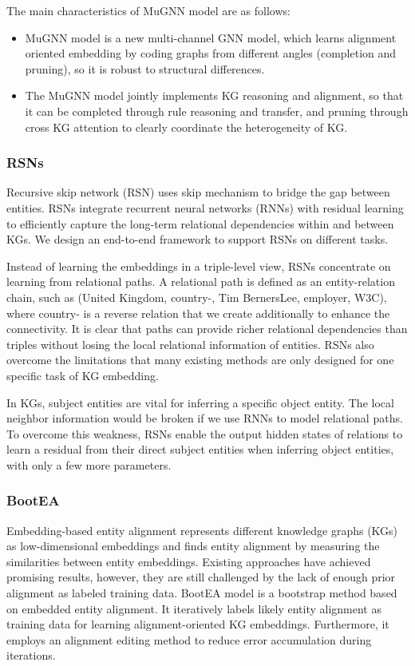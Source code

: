 \documentclass[sigconf]{acmart}
\begin{document}
{The main characteristics of MuGNN model are as follows:
\begin{itemize}
\item MuGNN model is a new multi-channel GNN model, which learns alignment oriented embedding by coding graphs from different angles (completion and pruning), so it is robust to structural differences.
\item The MuGNN model jointly implements KG reasoning and alignment, so that it can be completed through rule reasoning and transfer, and pruning through cross KG attention to clearly coordinate the heterogeneity of KG.
\end{itemize}

\subsubsection{RSNs \cite{guo2019learning}}

Recursive skip network (RSN) uses skip mechanism to bridge the gap between entities. RSNs integrate recurrent neural networks (RNNs) with residual learning to efficiently capture the long-term relational dependencies within and between KGs. We design an end-to-end framework to support RSNs on different tasks.

Instead of learning the embeddings in a triple-level view, RSNs concentrate on learning from relational paths. A relational path is defined as an entity-relation chain, such as (United Kingdom, country-, Tim BernersLee, employer, W3C), where country- is a reverse relation that we create additionally to enhance the connectivity. It is clear that paths can provide richer relational dependencies than triples without losing the local relational information of entities. RSNs also overcome the limitations that many existing methods are only designed for one specific task of KG embedding. 

In KGs, subject entities are vital for inferring a specific object entity. The local neighbor information would be broken if we use RNNs to model relational paths. To overcome this weakness, RSNs enable the output hidden states of relations to learn a residual from their direct subject entities when inferring object entities, with only a few more parameters.

\subsubsection{BootEA \cite{sun2018bootstrapping}}

Embedding-based entity alignment represents different knowledge graphs (KGs) as low-dimensional embeddings and finds entity alignment by measuring the similarities between entity embeddings. Existing approaches have achieved promising results, however, they are still challenged by the lack of enough prior alignment as labeled training data. BootEA model is a bootstrap method based on embedded entity alignment. It iteratively labels likely entity alignment as training data for learning alignment-oriented KG embeddings. Furthermore, it employs an alignment editing method to reduce error accumulation during iterations.

}
\end{document}

